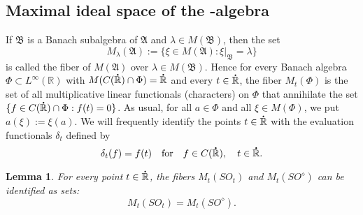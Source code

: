 \documentclass{birkjour}
\newtheorem{lemma}[theorem]{Lemma}
\numberwithin{equation}{section}
\newcommand{\R}{\mathbb{R}}
\newcommand{\fA}{\mathfrak{A}}
\newcommand{\fB}{\mathfrak{B}}
\newcommand{\dR}{{\bf\dot{\R}}}
\begin{document}
\subsection{Maximal ideal space of the -algebra
}
If $\fB$ is a Banach subalgebra of $\fA$ and
$\lambda\in M(\fB)$, then the set
\[
M_\lambda(\fA):=\{\xi\in M(\fA):\xi|_{\fB}=\lambda\}
\]
is called the fiber of $M(\fA)$ over $\lambda\in M(\fB)$.
Hence for every Banach algebra $\Phi\subset L^\infty(\R)$ with
$M(C(\dR)\cap\Phi)=\dR$ and every $t\in\dR$, the fiber $M_t(\Phi)$ is
the set of all multiplicative linear functionals (characters) on $\Phi$ that
annihilate the set $\{f\in C(\dR)\cap\Phi:f(t)=0\}$. As usual, for all
$a\in\Phi$ and all $\xi\in M(\Phi)$, we put $a(\xi):=\xi(a)$. We will
frequently identify the points $t\in\dR$ with the evaluation functionals
$\delta_t$ defined by
\[
\delta_t(f)=f(t)
\quad\mbox{for}\quad f\in C(\dR),\quad t\in\dR.
\]
\begin{lemma}\label{le:fibers-SOt-SO-diamond}
For every point $t\in\dR$, the fibers $M_t(SO_t)$ and $M_t(SO^\diamond)$ can
be identified as sets:
\begin{equation}\label{eq:fibers-SOt-SO-diamond-1}
M_t(SO_t)=M_t(SO^\diamond).
\end{equation}
\end{lemma}
\end{document}
